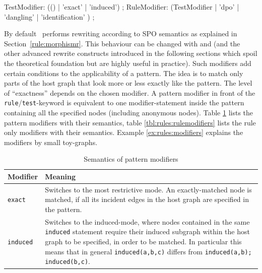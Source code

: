 \begin{rail}
  TestModifier: (() | 'exact' | 'induced') ;
  RuleModifier: (TestModifier | 'dpo' | 'dangling' | 'identification' ) ;
\end{rail}

By default \GrG\ performs rewriting according to SPO semantics as explained in Section~\ref{rule:morphismr}.
This behaviour can be changed with  and  (and the other advanced rewrite constructs introduced in the following sections which spoil the theoretical foundation but are highly useful in practice).
Such modifiers add certain conditions to the applicability of a pattern.
The idea is to match only parts of the host graph that look more or less exactly like the pattern.
The level of ``exactness'' depends on the chosen modifier.
A pattern modifier in front of the \texttt{rule}/\texttt{test}-keyword is equivalent to one modifier-statement inside the pattern containing all the specified nodes (including anonymous nodes).
Table \ref{tbl:rules:patternmodifiers} lists the pattern modifiers with their semantics, table \ref{tbl:rules:rulemodifiers} lists the rule only modifiers with their semantics.
Example \ref{ex:rules:modifiers} explains the modifiers by small toy-graphs.

\begin{table}[htbp]
    \begin{tabularx}{\linewidth}{l|X}
        \bf Modifier & \bf Meaning \\\hline
        \texttt{exact} & Switches to the most restrictive mode. An exactly-matched node is matched, if all its incident edges in the host graph are specified in the pattern.\\
        \texttt{induced} & Switches to the induced-mode, where nodes contained in the same \texttt{induced} statement require their induced subgraph within the host graph to be specified, in order to be matched. In particular this means that in general \texttt{induced(a,b,c)} differs from \texttt{induced(a,b); induced(b,c)}.\\
    \end{tabularx}
    \caption{Semantics of pattern modifiers}
    \label{tbl:rules:patternmodifiers}
\end{table}

